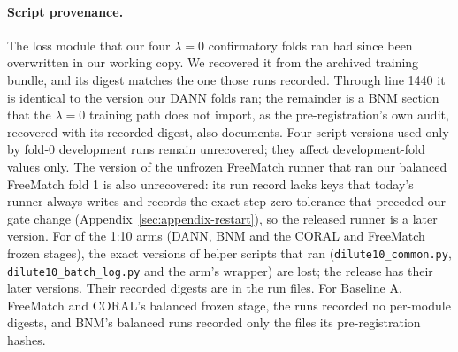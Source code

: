 \paragraph{Script provenance.} The loss module that our four $\lambda = 0$ confirmatory folds ran
had since been overwritten in our working copy. We recovered it from the archived training
bundle, and its digest matches the one those runs recorded. Through line 1440 it is identical to
the version our DANN folds ran; the remainder is a BNM section that the $\lambda = 0$ training
path does not import, as the pre-registration's own audit, recovered with its recorded digest,
also documents. Four script versions used only by fold-0 development runs remain unrecovered;
they affect development-fold values only. The version of the unfrozen FreeMatch runner that
ran our balanced FreeMatch fold 1 is also unrecovered: its run record lacks \fmFoldOneMissingWord{} keys that
today's runner always writes and records the exact step-zero tolerance that preceded our gate
change (Appendix~\ref{sec:appendix-restart}), so the released runner is a later version.
For \dlLostArmsWord{} of the 1:10 arms (DANN, BNM and the CORAL and FreeMatch frozen
stages), the exact versions of \dlLostFilesWord{} helper scripts that ran
(\texttt{dilute10\_common.py}, \texttt{dilute10\_batch\_log.py} and the arm's wrapper) are lost;
the release has their later versions. Their recorded digests are in the run files. For
Baseline A, FreeMatch and CORAL's balanced frozen stage, the runs recorded no per-module digests,
and BNM's balanced runs recorded only the files its pre-registration hashes.

